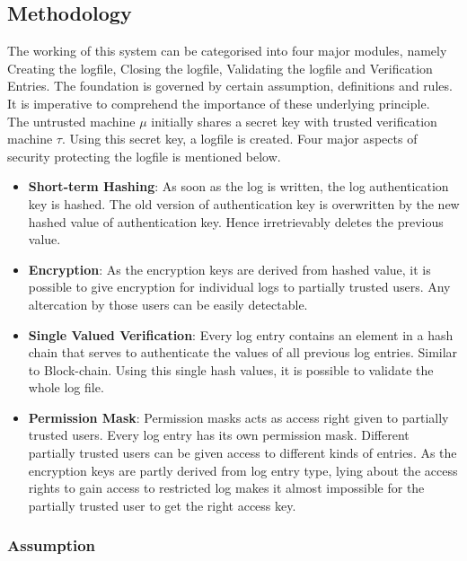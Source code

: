 \documentclass[12pt, letter]{article}
\begin{document}
\subsection{Methodology}

The working of this system can be categorised into four major modules, namely Creating the logfile, Closing the logfile, Validating the logfile and Verification Entries. The foundation is governed by certain assumption, definitions and rules. It is imperative to comprehend the importance of these underlying principle.\\


The untrusted machine $\mu$ initially shares a secret key with trusted verification machine $\tau$. Using this secret key, a logfile is created. Four major aspects of security protecting the logfile is mentioned below.

\begin{itemize}
    \item \textbf{Short-term Hashing}: As soon as the log is written, the log authentication key is hashed. The old version of authentication key is overwritten by the new hashed value of authentication key. Hence irretrievably deletes the previous value.
    
    \item \textbf{Encryption}: As the encryption keys are derived from hashed value, it is possible to give encryption for individual logs to partially trusted users. Any altercation by those users can be easily detectable.
    
    \item \textbf{Single Valued Verification}: Every log entry contains an element in a hash chain that serves to authenticate the values of all previous log entries. Similar to Block-chain. Using this single hash values, it is possible to validate the whole log file.
    
    \item \textbf{Permission Mask}: Permission masks acts as access right given to partially trusted users. Every log entry has its own permission mask. Different partially trusted users can be given access to different kinds of entries. As the encryption keys are partly derived from log entry type, lying about the access rights to gain access to restricted log makes it almost impossible for the partially trusted user to get the right access key.
    
\end{itemize}

\subsubsection{Assumption}
\end{document}
